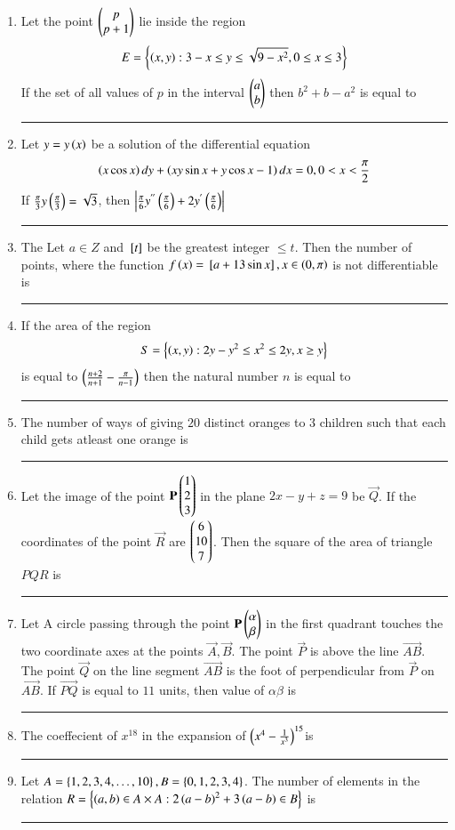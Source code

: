 \documentclass[journal]{IEEEtran}
\begin{document}
\begin{enumerate}
		\item Let the point $\begin{pmatrix}p\\p+1\end{pmatrix}$ lie inside the region 
			\begin{align*}
				E=\left\{\left(x,y\right): 3-x \le y \le \sqrt{9-x^2}, 0 \le x \le 3\right\}
			\end{align*}
		If the set of all values of $p$ in the interval $\begin{pmatrix}a\\b\end{pmatrix}$ then $b^2+b-a^2$ is equal to \rule{2cm}{0.1pt}
	\item Let $y=y\left(x\right)$ be a solution of the differential equation 
		\begin{align*}
			\left(x\cos x\right)dy+\left(xy\sin x +y\cos x-1\right)dx=0,0<x<\frac{\pi}{2}
		\end{align*}
		If $\frac{\pi}{3}y\left(\frac{\pi}{3}\right)=\sqrt{3}$, then $\left\vert\frac{\pi}{6}y^{''}\left(\frac{\pi}{6}\right)+2y^{'}\left(\frac{\pi}{6}\right)\right\vert$\rule{2cm}{0.1pt}
	\item The Let $a \in Z$ and ${}\left[t\right]$ be the greatest integer $\le t$. Then the number of points, where the function $f\left(x\right)={}\left[a+13\sin x\right], x\in\left(0,\pi\right)$ is not differentiable is\rule{2cm}{0.1pt}
	\item If the area of the region 
		\begin{align*}
			S=\left\{\left(x,y\right):2y-y^2 \le x^2 \le 2y, x \ge y\right\}
		\end{align*}
		is equal to $\left(\frac{n+2}{n+1}-\frac{\pi}{n-1}\right)$ then the natural number $n$ is equal to \rule{2cm}{0.1pt}
	\item The number of ways of giving $20$ distinct oranges to $3$ children such that each child gets atleast one orange is \rule{2cm}{0.1pt}
	\item Let the image of the point $\mathbf{P}\begin{pmatrix}1\\2\\3\end{pmatrix}$ in the plane $2x-y+z=9$ be $\vec{Q}$. If the coordinates of the point $\vec{R}$ are $\begin{pmatrix}6\\10\\7\end{pmatrix}$. Then the square of the area of triangle $PQR$ is \rule{2cm}{0.1pt}
	\item Let A circle passing through the point $\mathbf{P}\begin{pmatrix}\alpha\\\beta\end{pmatrix}$ in the first quadrant touches the two coordinate axes at the points $\vec{A},\vec{B}$. The point $\vec{P}$ is above the line $\vec{AB}$. The point $\vec{Q}$ on the line segment $\vec{AB}$ is the foot of perpendicular from $\vec{P}$ on $\vec{AB}$. If $\vec{PQ}$ is equal to $11$ units, then value of $\alpha\beta$ is \rule{2cm}{0.1pt}
	\item The coeffecient of $x^{18}$ in the expansion of $\left(x^4-\frac{1}{x^3}\right)^{15}$is \rule{2cm}{0.1pt}
	\item Let $A=\left\{1,2,3,4,\dots,10\right\}, B=\left\{0,1,2,3,4\right\}$. The number of elements in the relation $R=\left\{\left(a,b\right)\in A \times A: 2\left(a-b\right)^2+3\left(a-b\right) \in B\right\}$ is \rule{2cm}{0.1pt}
\end{enumerate}
\end{document}
